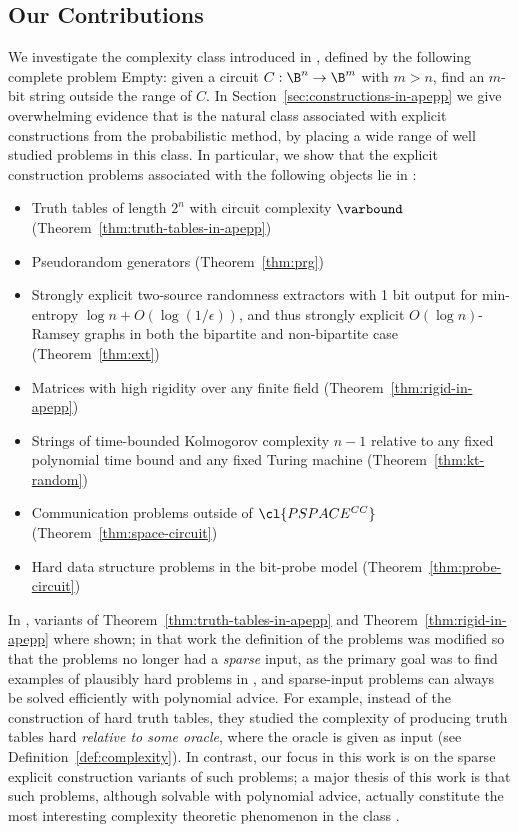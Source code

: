 \subsection{Our Contributions}
We investigate the complexity class  introduced in \cite{total}, defined by the following complete problem {\sc Empty}: given a circuit $C: \B^n \rightarrow \B^m$ with $m > n$, find an $m$-bit string outside the range of $C$. In Section~\ref{sec:constructions-in-apepp} we give overwhelming evidence that  is the natural class associated with explicit constructions from the probabilistic method, by placing a wide range of well studied problems in this class. In particular, we show that the explicit construction problems associated with the following objects lie in :
\begin{itemize}
    \item Truth tables of length $2^n$ with circuit complexity $\varbound$ (Theorem~\ref{thm:truth-tables-in-apepp})
    \item Pseudorandom generators (Theorem~\ref{thm:prg})
    \item Strongly explicit two-source randomness extractors with 1 bit output for min-entropy $\log n + O(\log(1/\epsilon))$, and thus strongly explicit $O(\log n)$-Ramsey graphs in both the bipartite and non-bipartite case (Theorem~\ref{thm:ext})
    \item Matrices with high rigidity over any finite field (Theorem~\ref{thm:rigid-in-apepp})
    \item Strings of time-bounded Kolmogorov complexity $n - 1$ relative to any fixed polynomial time bound and any fixed Turing machine (Theorem~\ref{thm:kt-random})
    \item Communication problems outside of $\cl{PSPACE^{CC}}$ (Theorem~\ref{thm:space-circuit})
    \item Hard data structure problems in the bit-probe model (Theorem~\ref{thm:probe-circuit})
\end{itemize}

In \cite{total}, variants of Theorem~\ref{thm:truth-tables-in-apepp} and Theorem~\ref{thm:rigid-in-apepp} where shown; in that work the definition of the problems was modified so that the problems no longer had a \emph{sparse} input, as the primary goal was to find examples of plausibly hard problems in , and sparse-input problems can always be solved efficiently with polynomial advice. For example, instead of the construction of hard truth tables, they studied the complexity of producing truth tables hard \emph{relative to some oracle}, where the oracle is given as input (see Definition~\ref{def:complexity}). In contrast, our focus in this work is on the sparse explicit construction variants of such problems; a major thesis of this work is that such problems, although solvable with polynomial advice, actually constitute the most interesting complexity theoretic phenomenon in the class .

